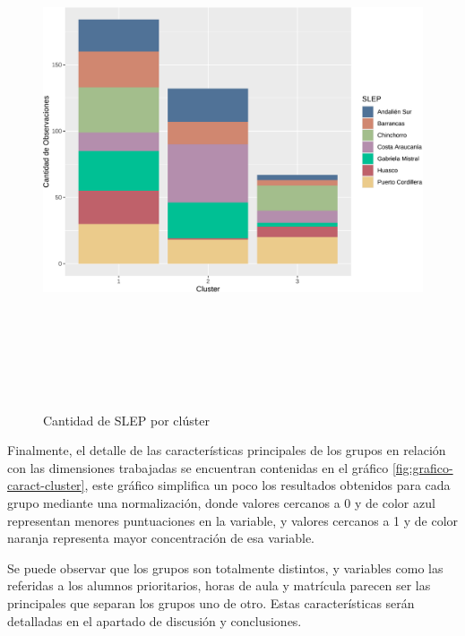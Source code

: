 \documentclass[
  12pt,
  letterpaper,
]{article}
\begin{document}
\begin{figure}

{\centering \includegraphics[width=0.8\linewidth,height=6in]{tesis_ver_final_files/figure-latex/grafico-detalle-cluster-1} 

}

\caption{Cantidad de SLEP por clúster}\label{fig:grafico-detalle-cluster}
\end{figure}

Finalmente, el detalle de las características principales de los grupos en relación con las dimensiones trabajadas se encuentran contenidas en el gráfico \ref{fig:grafico-caract-cluster}, este gráfico simplifica un poco los resultados obtenidos para cada grupo mediante una normalización, donde valores cercanos a 0 y de color azul representan menores puntuaciones en la variable, y valores cercanos a 1 y de color naranja representa mayor concentración de esa variable.

Se puede observar que los grupos son totalmente distintos, y variables como las referidas a los alumnos prioritarios, horas de aula y matrícula parecen ser las principales que separan los grupos uno de otro.
Estas características serán detalladas en el apartado de discusión y conclusiones.
\end{document}
